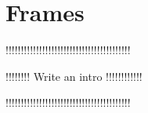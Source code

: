 \chapter{Frames}\label{ch:frames}


!!!!!!!!!!!!!!!!!!!!!!!!!!!!!!!!!!!!!!!!!

!!!!!!!!    Write an intro   !!!!!!!!!!!!

!!!!!!!!!!!!!!!!!!!!!!!!!!!!!!!!!!!!!!!!!